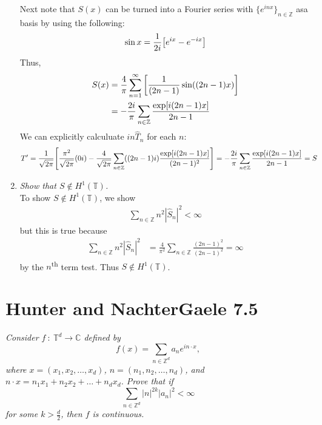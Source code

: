 \documentclass[12pt]{article}
\theoremstyle{plain}
\begin{document}
\begin{enumerate}[\bf (a)]
        Next note that $S(x)$ can be turned into a Fourier series with $\{e^{inx}\}_{n\in\mathbb{Z}}$ asa basis by using the following:
        \begin{align*}
            \sin x = \frac{1}{2i}\qty[e^{ix} - e^{-ix}]
        \end{align*}
        Thus,
        \begin{align*}
            S(x) &= \frac{4}{\pi}\sum_{n=1}^\infty\qty[\frac{1}{(2n-1)}\sin((2n-1)x)] \\
            &= -\frac{2i}{\pi}\sum_{n\in\mathbb{Z}}\frac{\exp[i(2n-1)x]}{2n-1}
        \end{align*}
        We can explicitly calculuate $in\hat{T}_n$ for each $n$:
        \begin{align*}
            T' = \frac{1}{\sqrt{2\pi}}\qty[\frac{\pi^2}{\sqrt{2\pi}}(0i) - \frac{4}{\sqrt{2\pi}}\sum_{n\in\mathbb{Z}}((2n-1)i)\frac{\exp[i(2n-1)x]}{(2n-1)^2}] &= -\frac{2i}{\pi}\sum_{n\in\mathbb{Z}}\frac{\exp[i(2n-1)x]}{2n-1} = S
        \end{align*}
    \item
        \emph{Show that $S \not\in H^1(\mathbb{T})$.} \\

        To show $S \not\in H^1(\mathbb{T})$, we show
        \begin{align*}
            \sum_{n\in\mathbb{Z}} n^2 |\hat{S}_n|^2 < \infty
        \end{align*}
        but this is true because
        \begin{align*}
            \sum_{n\in\mathbb{Z}} n^2 |\hat{S}_n|^2 &= \frac{4}{\pi^2}\sum_{n\in\mathbb{Z}} \frac{(2n-1)^2}{(2n-1)^2} = \infty
        \end{align*}
        by the $n$\textsuperscript{th} term test.  Thus $S \not\in H^1(\mathbb{T})$.
\end{enumerate}

\section*{Hunter and NachterGaele 7.5}
\emph{Consider $f\ :\ \mathbb{T}^d \rightarrow \mathbb{C}$ defined by $$f(x) = \sum_{n\in\mathbb{Z}^d}a_n e^{i n \cdot x},$$ where $x = (x_1, x_2, \dots, x_d)$, $n = (n_1, n_2, \dots, n_d)$, and $n\cdot x = n_1x_1 + n_2x_2 + \dots + n_dx_d$.  Prove that if $$\sum_{n\in\mathbb{Z}^d}|n|^{2k}|a_n|^2 <\infty$$ for some $k > \frac{d}{2}$, then $f$ is continuous.} \\
\end{document}
